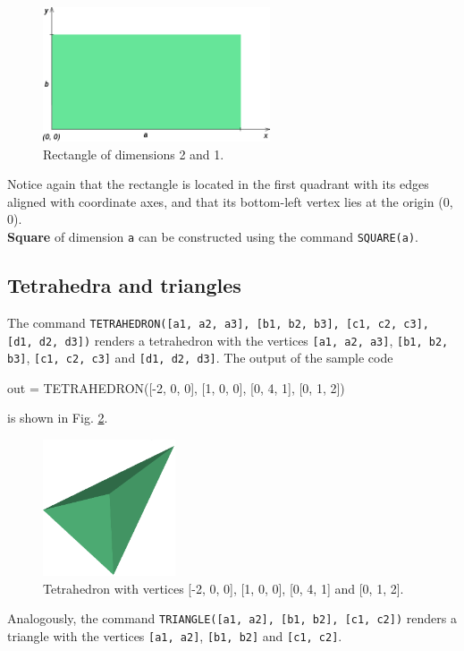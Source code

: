 \begin{figure}[!ht]
\begin{center}
\includegraphics[width=0.6\textwidth]{img/cuboid-2.png}
\end{center}
\vspace{-4mm}
\caption{Rectangle of dimensions 2 and 1.}
\label{fig:cuboid-2}
\end{figure}
\noindent
Notice again that the rectangle is located in the first quadrant with its edges 
aligned with coordinate axes, and that its bottom-left vertex lies at the 
origin (0, 0). \\

\noindent
{\bf Square} of dimension {\tt a} can be constructed using the command {\tt SQUARE(a)}.  

\subsection{Tetrahedra and triangles}

The command {\tt TETRAHEDRON([a1, a2, a3], [b1, b2, b3], [c1, c2, c3], [d1, d2, d3])} renders 
a tetrahedron with the vertices {\tt [a1, a2, a3]}, {\tt [b1, b2, b3]}, {\tt [c1, c2, c3]}
and {\tt [d1, d2, d3]}. The output of the sample code

\begin{bluecode}
out = TETRAHEDRON([-2, 0, 0], [1, 0, 0], [0, 4, 1], [0, 1, 2])
\end{bluecode}
is shown in Fig. \ref{fig:chull}.

\begin{figure}[!ht]
\begin{center}
\includegraphics[width=0.35\textwidth]{img/chull.png}
\end{center}
\vspace{-4mm}
\caption{Tetrahedron with vertices [-2, 0, 0], [1, 0, 0], [0, 4, 1] and [0, 1, 2].}
\label{fig:chull}
\end{figure}
\noindent
Analogously, the command {\tt TRIANGLE([a1, a2], [b1, b2], [c1, c2])} renders 
a triangle with the vertices {\tt [a1, a2]}, {\tt [b1, b2]} and {\tt [c1, c2]}. 

